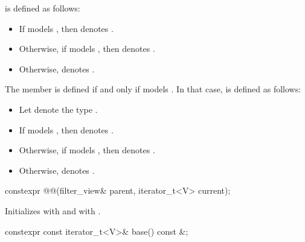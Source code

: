 \pnum
{} is defined as follows:
\begin{itemize}
\item If  models , then
 denotes .

\item Otherwise, if  models , then
 denotes .

\item Otherwise,  denotes .
\end{itemize}

\pnum
The member   is defined
if and only if  models .
In that case,
 is defined as follows:
\begin{itemize}
\item Let  denote the type
.

\item If  models
,
then  denotes .

\item Otherwise, if   models
,
then  denotes .

\item Otherwise,  denotes .
\end{itemize}

%
\begin{itemdecl}
constexpr @@(filter_view& parent, iterator_t<V> current);
\end{itemdecl}

\begin{itemdescr}
\pnum
\effects
Initializes  with  and
 with .
\end{itemdescr}

%
\begin{itemdecl}
constexpr const iterator_t<V>& base() const &;
\end{itemdecl}

